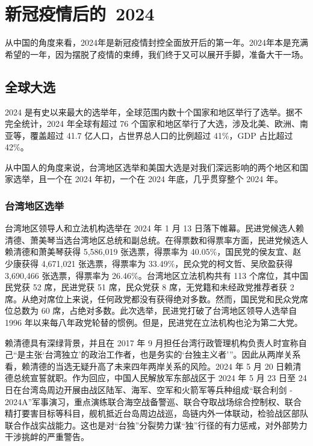 \chapter{新冠疫情后的~2024}

从中国的角度来看，2024年是新冠疫情封控全面放开后的第一年。2024年本是充满希望的一年，因为摆脱了疫情的束缚，我们终于又可以展开手脚，准备大干一场。

\section{全球大选}

2024 是有史以来最大的选举年，全球范围内数十个国家和地区举行了选举。据不完全统计，2024 年全球有超过 76 个国家和地区举行了大选，涉及北美、欧洲、南亚等，覆盖超过 41.7 亿人口，占世界总人口的比例超过 41\%，GDP 占比超过 42\%。 

从中国人的角度来说，台湾地区选举和美国大选是对我们深远影响的两个地区和国家选举，且一个在 2024 年初，一个在 2024 年底，几乎贯穿整个 2024 年。

\subsection{台湾地区选举}

台湾地区领导人和立法机构选举在 2024 年 1 月 13 日落下帷幕。民进党候选人赖清德、萧美琴当选台湾地区总统和副总统。在得票数和得票率方面，民进党候选人赖清德和萧美琴获得 5,586,019 张选票，得票率为 40.05\%，国民党的侯友宜、赵少康获得 4,671,021 张选票，得票率为 33.49\%，民众党的柯文哲、吴欣盈获得 3,690,466 张选票，得票率为 26.46\%。台湾地区立法机构共有 113 个席位，其中国民党获 52 席，民进党获 51 席，民众党获 8 席，无党籍和未经政党推荐者获 2 席。从绝对席位上来说，任何政党都没有获得绝对多数。然而，国民党和民众党席位总数为 60 席，占绝对多数。此次选举，民进党打破了台湾地区领导人选举自 1996 年以来每八年政党轮替的惯例。但是，民进党在立法机构也沦为第二大党。

赖清德具有深绿背景，并且在 2017 年 9 月担任台湾行政管理机构负责人时宣称自己“是主张‘台湾独立’的政治工作者，也是务实的‘台独主义者’”。因此从两岸关系看，赖清德的当选无疑升高了未来四年两岸关系的风险。2024 年 5 月 20 日赖清德总统宣誓就职。作为回应，中国人民解放军东部战区于 2024 年 5 月 23 日至 24 日在台湾岛周边开展由战区陆军、海军、空军和火箭军等兵种组成“联合利剑 - 2024A”军事演习，重点演练联合海空战备警巡、联合夺取战场综合控制权、联合精打要害目标等科目，舰机抵近台岛周边战巡，岛链内外一体联动，检验战区部队联合作战实战能力。这也是对“台独”分裂势力谋“独”行径的有力惩戒，对外部势力干涉挑衅的严重警告。

